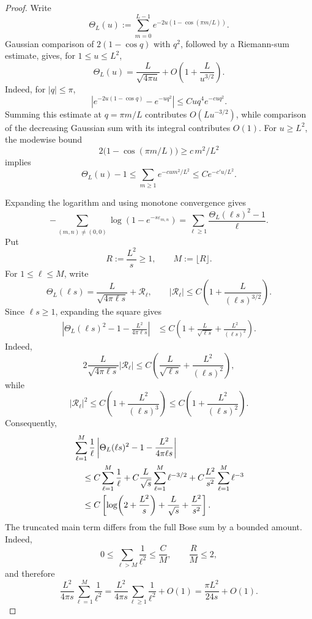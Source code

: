 \documentclass[11pt]{article}
\numberwithin{equation}{section}
\theoremstyle{remark}
\newcommand{\1}{\mathbf 1}
\begin{document}
\begin{proof}
Write
\[
 \Theta_L(u):=\sum_{m=0}^{L-1}
 e^{-2u(1-\cos(\pi m/L))}.
\]
Gaussian comparison of \(2(1-\cos q)\) with \(q^2\), followed by a
Riemann-sum estimate, gives, for \(1\leq u\leq L^2\),
\begin{equation}
 \Theta_L(u)=\frac{L}{\sqrt{4\pi u}}
 +O\!\left(1+\frac{L}{u^{3/2}}\right).
 \label{eq:one-dimensional-neumann-trace}
\end{equation}
Indeed, for \(|q|\leq\pi\),
\[
 \left|e^{-2u(1-\cos q)}-e^{-uq^2}\right|
 \leq Cuq^4e^{-cuq^2}.
\]
Summing this estimate at \(q=\pi m/L\) contributes
\(O(Lu^{-3/2})\), while comparison of the decreasing Gaussian sum with
its integral contributes \(O(1)\).  For \(u\geq L^2\), the modewise bound
\[
 2\bigl(1-\cos(\pi m/L)\bigr)\geq c\,m^2/L^2
\]
implies
\[
 \Theta_L(u)-1
 \leq\sum_{m\geq1}e^{-cu m^2/L^2}
 \leq Ce^{-c'u/L^2}.
\]

Expanding the logarithm and using monotone convergence gives
\begin{equation}
 -\sum_{(m,n)\ne(0,0)}\log(1-e^{-s\varepsilon_{m,n}})
 =\sum_{\ell\geq1}\frac{\Theta_L(\ell s)^2-1}{\ell}.
 \label{eq:heat-log-expansion}
\end{equation}
Put
\[
 R:=\frac{L^2}{s}\geq1,
 \qquad M:=\lfloor R\rfloor.
\]
For \(1\leq\ell\leq M\), write
\[
 \Theta_L(\ell s)
 =\frac{L}{\sqrt{4\pi\ell s}}+\mathcal R_\ell,
 \qquad
 |\mathcal R_\ell|
 \leq C\left(1+\frac{L}{(\ell s)^{3/2}}\right).
\]
Since \(\ell s\geq1\), expanding the square gives
\begin{align}
 \left|
 \Theta_L(\ell s)^2-1-\frac{L^2}{4\pi\ell s}
 \right|
 &\leq C\left(
 1+\frac{L}{\sqrt{\ell s}}+\frac{L^2}{(\ell s)^2}
 \right).
 \label{eq:heat-trace-square-error}
\end{align}
Indeed,
\[
 2\frac{L}{\sqrt{4\pi\ell s}}|\mathcal R_\ell|
 \leq C\left(\frac{L}{\sqrt{\ell s}}
 +\frac{L^2}{(\ell s)^2}\right),
\]
while
\[
 |\mathcal R_\ell|^2
 \leq C\left(1+\frac{L^2}{(\ell s)^3}\right)
 \leq C\left(1+\frac{L^2}{(\ell s)^2}\right).
\]
Consequently,
\begin{align}
 &\sum_{\ell=1}^{M}\frac1\ell
 \left|
 \Theta_L(\ell s)^2-1-\frac{L^2}{4\pi\ell s}
 \right| \notag\\
 &\quad\leq C\sum_{\ell=1}^{M}\frac1\ell
 +C\frac{L}{\sqrt s}\sum_{\ell=1}^{M}\ell^{-3/2}
 +C\frac{L^2}{s^2}\sum_{\ell=1}^{M}\ell^{-3} \notag\\
 &\quad\leq C\left[
 \log\!\left(2+\frac{L^2}{s}\right)
 +\frac{L}{\sqrt s}+\frac{L^2}{s^2}\right].
 \label{eq:heat-trace-summed-error}
\end{align}
The truncated main term differs from the full Bose sum by a bounded
amount.  Indeed,
\[
 0\leq\sum_{\ell>M}\frac1{\ell^2}\leq\frac{C}{M},
 \qquad \frac{R}{M}\leq2,
\]
and therefore
\begin{equation}
 \frac{L^2}{4\pi s}\sum_{\ell=1}^{M}\frac1{\ell^2}
 =\frac{L^2}{4\pi s}\sum_{\ell\geq1}\frac1{\ell^2}+O(1)
 =\frac{\pi L^2}{24s}+O(1).
 \label{eq:heat-trace-main-term}
\end{equation}


\end{proof}
\end{document}
